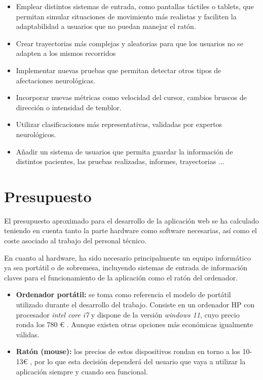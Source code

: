 \begin{itemize}
\item Emplear distintos sistemas de entrada, como pantallas táctiles o tablets, que permitan simular situaciones de movimiento más realistas y faciliten la adaptabilidad a usuarios que no puedan manejar el ratón.
\item Crear trayectorias más complejas y aleatorias para que los usuarios no se adapten a los mismos recorridos
\item Implementar nuevas pruebas que permitan detectar otros tipos de afectaciones neurológicas.
\item Incorporar nuevas métricas como velocidad del cursor, cambios bruscos de dirección o intensidad de temblor.
\item Utilizar clasificaciones más representativas, validadas por expertos neurológicos.
\item Añadir un sistema de usuarios que permita guardar la información de distintos pacientes, las pruebas realizadas, informes, trayectorias ...

\end{itemize}

\section{Presupuesto}

El presupuesto aproximado para el desarrollo de la aplicación web se ha calculado teniendo en cuenta tanto la parte hardware como software necesarias, así como el coste asociado al trabajo del personal técnico.

En cuanto al hardware, ha sido necesario principalmente un equipo informático ya sea portátil o de sobremesa, incluyendo sistemas de entrada de información claves para el funcionamiento de la aplicación como el ratón del ordenador.
\clearpage
\begin{itemize}
\item \textbf{Ordenador portátil:} se toma como referencia el modelo de portátil utilizado durante el desarrollo del trabajo. Consiste en un ordenador HP con procesador \textit{intel core i7} y dispone de la versión \textit{windows 11}, cuyo precio ronda los 780 € \cite{hp_15_fd0334ns_pccomponentes}. Aunque existen otras opciones más económicas igualmente válidas.
\item \textbf{Ratón (mouse):} los precios de estos dispositivos rondan en torno a los 10-13€ \cite{conceptronic_regas_tw5_pccomponentes}, por lo que esta decisión dependerá del usuario que vaya a utilizar la aplicación siempre y cuando sea funcional.
\end{itemize}

